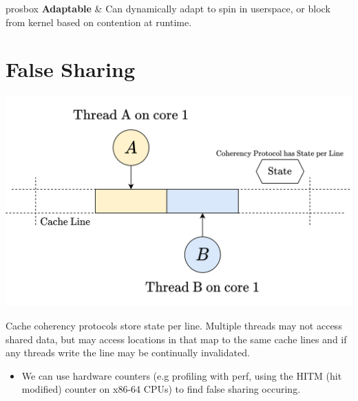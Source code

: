 \begin{tabbox}{prosbox}
    \textbf{Adaptable} & Can dynamically adapt to spin in userspace, or block from kernel based on contention at runtime. \\  
\end{tabbox}

\section{False Sharing}
\begin{center}
    \includegraphics[width=.7\textwidth]{parallelism/images/false_sharing.drawio.png}
\end{center}
Cache coherency protocols store state per line. Multiple threads may not access shared data, but may access locations in that map to the same cache lines and if any threads write the line may be continually invalidated.
\begin{itemize}
    \item We can use hardware counters (e.g profiling with perf, using the HITM (hit modified) counter on x86-64 CPUs) to find false sharing occuring.
\end{itemize}

